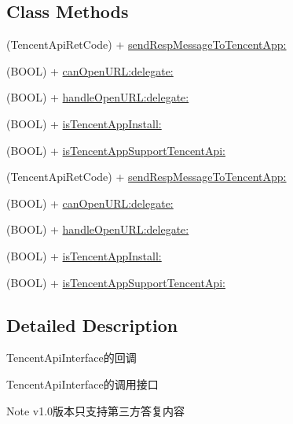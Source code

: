 \subsection*{Class Methods}
\begin{DoxyCompactItemize}
\item 
(Tencent\+Api\+Ret\+Code) + \mbox{\hyperlink{interface_tencent_api_interface_a9c499a7e750658a6f81c92d1b0b27908}{send\+Resp\+Message\+To\+Tencent\+App\+:}}
\item 
(B\+O\+OL) + \mbox{\hyperlink{interface_tencent_api_interface_a83503ce75857d63f305322e0632ffea3}{can\+Open\+U\+R\+L\+:delegate\+:}}
\item 
(B\+O\+OL) + \mbox{\hyperlink{interface_tencent_api_interface_a3c0606f58a848dcfa3f76e11f8046612}{handle\+Open\+U\+R\+L\+:delegate\+:}}
\item 
(B\+O\+OL) + \mbox{\hyperlink{interface_tencent_api_interface_ad336d33ff09293be98acb49a6509a9d0}{is\+Tencent\+App\+Install\+:}}
\item 
(B\+O\+OL) + \mbox{\hyperlink{interface_tencent_api_interface_a5286611f97530ca889a83d0b34bc74d1}{is\+Tencent\+App\+Support\+Tencent\+Api\+:}}
\item 
(Tencent\+Api\+Ret\+Code) + \mbox{\hyperlink{interface_tencent_api_interface_a9c499a7e750658a6f81c92d1b0b27908}{send\+Resp\+Message\+To\+Tencent\+App\+:}}
\item 
(B\+O\+OL) + \mbox{\hyperlink{interface_tencent_api_interface_a83503ce75857d63f305322e0632ffea3}{can\+Open\+U\+R\+L\+:delegate\+:}}
\item 
(B\+O\+OL) + \mbox{\hyperlink{interface_tencent_api_interface_a3c0606f58a848dcfa3f76e11f8046612}{handle\+Open\+U\+R\+L\+:delegate\+:}}
\item 
(B\+O\+OL) + \mbox{\hyperlink{interface_tencent_api_interface_ad336d33ff09293be98acb49a6509a9d0}{is\+Tencent\+App\+Install\+:}}
\item 
(B\+O\+OL) + \mbox{\hyperlink{interface_tencent_api_interface_a5286611f97530ca889a83d0b34bc74d1}{is\+Tencent\+App\+Support\+Tencent\+Api\+:}}
\end{DoxyCompactItemize}


\subsection{Detailed Description}
Tencent\+Api\+Interface的回调 

Tencent\+Api\+Interface的调用接口 \begin{DoxyNote}{Note}
v1.\+0版本只支持第三方答复内容 
\end{DoxyNote}


